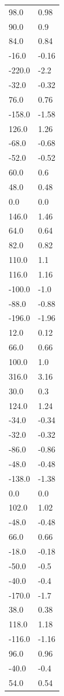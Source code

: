 \begin{longtable}{ll}
98.0 & 0.98 \\
90.0 & 0.9 \\
84.0 & 0.84 \\
-16.0 & -0.16 \\
-220.0 & -2.2 \\
-32.0 & -0.32 \\
76.0 & 0.76 \\
-158.0 & -1.58 \\
126.0 & 1.26 \\
-68.0 & -0.68 \\
-52.0 & -0.52 \\
60.0 & 0.6 \\
48.0 & 0.48 \\
0.0 & 0.0 \\
146.0 & 1.46 \\
64.0 & 0.64 \\
82.0 & 0.82 \\
110.0 & 1.1 \\
116.0 & 1.16 \\
-100.0 & -1.0 \\
-88.0 & -0.88 \\
-196.0 & -1.96 \\
12.0 & 0.12 \\
66.0 & 0.66 \\
100.0 & 1.0 \\
316.0 & 3.16 \\
30.0 & 0.3 \\
124.0 & 1.24 \\
-34.0 & -0.34 \\
-32.0 & -0.32 \\
-86.0 & -0.86 \\
-48.0 & -0.48 \\
-138.0 & -1.38 \\
0.0 & 0.0 \\
102.0 & 1.02 \\
-48.0 & -0.48 \\
66.0 & 0.66 \\
-18.0 & -0.18 \\
-50.0 & -0.5 \\
-40.0 & -0.4 \\
-170.0 & -1.7 \\
38.0 & 0.38 \\
118.0 & 1.18 \\
-116.0 & -1.16 \\
96.0 & 0.96 \\
-40.0 & -0.4 \\
54.0 & 0.54 \\

\end{longtable}
